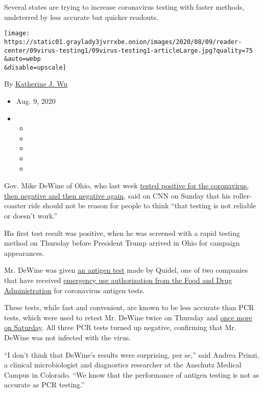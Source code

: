 Several states are trying to increase coronavirus testing with faster
methods, undeterred by less accurate but quicker readouts.

\texttt{[image: https://static01.graylady3jvrrxbe.onion/images/2020/08/09/reader-center/09virus-testing1/09virus-testing1-articleLarge.jpg?quality=75\\\&auto=webp\\\&disable=upscale]}

By
\href{https://www.nytimes3xbfgragh.onion/by/katherine-j--wu}{Katherine
J. Wu}

\begin{itemize}
\item
  Aug. 9, 2020
\item
  \begin{itemize}
  \item
  \item
  \item
  \item
  \item
  \end{itemize}
\end{itemize}

Gov. Mike DeWine of Ohio, who last week
\href{https://www.nytimes3xbfgragh.onion/2020/08/06/us/mike-dewine-coronavirus.html}{tested
positive for the coronavirus, then negative and then negative again},
said on CNN on Sunday that his roller-coaster ride should not be reason
for people to think ``that testing is not reliable or doesn't work.''

His first test result was positive, when he was screened with a rapid
testing method on Thursday before President Trump arrived in Ohio for
campaign appearances.

Mr. DeWine was given
\href{https://www.nytimes3xbfgragh.onion/2020/08/07/us/covid-test-accuracy-governor-dewine-ohio.html}{an
antigen test} made by Quidel, one of two companies that have received
\href{https://www.fda.gov/medical-devices/coronavirus-disease-2019-covid-19-emergency-use-authorizations-medical-devices/vitro-diagnostics-euas\#individual-antigen}{emergency
use authorization from the Food and Drug Administration} for coronavirus
antigen tests.

These tests, while fast and convenient, are known to be less accurate
than PCR tests, which were used to retest Mr. DeWine twice on Thursday
and
\href{https://twitter.com/MikeDeWine/status/1292192192312770561}{once
more on Saturday}. All three PCR tests turned up negative, confirming
that Mr. DeWine was not infected with the virus.

``I don't think that DeWine's results were surprising, per se,'' said
Andrea Prinzi, a clinical microbiologist and diagnostics researcher at
the Anschutz Medical Campus in Colorado. ``We know that the performance
of antigen testing is not as accurate as PCR testing.''

